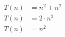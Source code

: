 \begin{subequations}
\begin{align}
\label{eq:findedgels7}
T(n)& = n^2 + n^2\\
\label{eq:findedgels8}
T(n)& = 2 \cdot n^2\\
\label{eq:findedgels9}
T(n)& = n^2
\end{align}
\end{subequations}
